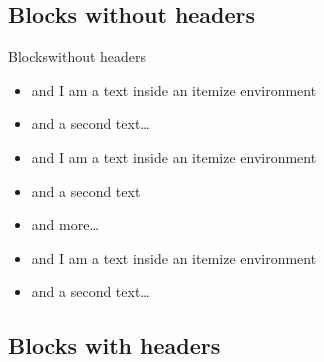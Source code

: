 \documentclass[]{beamer}
\begin{document}
\subsection{Blocks without headers}

\begin{frame}{Blocks}{without headers}
\begin{block}{}
\begin{itemize}
\item and I am a text inside an itemize environment
\item and a second text\ldots
\end{itemize}
\end{block}

\vfill

\begin{exampleblock}{}
\begin{itemize}
\item and I am a text inside an itemize environment
\item and a second text
\item and more\ldots
\end{itemize}
\end{exampleblock}

\vfill

\begin{alertblock}{}
\begin{itemize}
\item and I am a text inside an itemize environment
\item and a second text\ldots
\end{itemize}
\end{alertblock}
\end{frame}


\subsection{Blocks with headers}
\end{document}
